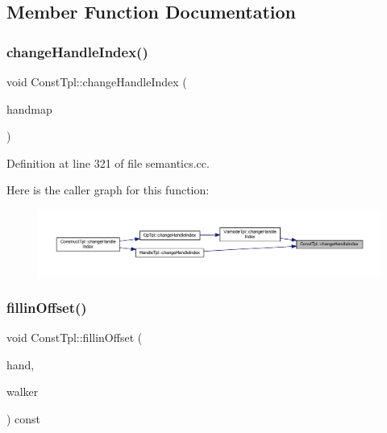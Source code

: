 \subsection{Member Function Documentation}
\mbox{\label{class_const_tpl_abfd18cee78e9e1aedd8f2e2c42f7c40f}} 
\subsubsection{\texorpdfstring{changeHandleIndex()}{changeHandleIndex()}}
{\footnotesize\ttfamily void Const\+Tpl\+::change\+Handle\+Index (\begin{DoxyParamCaption}\item[{const vector$<$ int4 $>$ \&}]{handmap }\end{DoxyParamCaption})}



Definition at line 321 of file semantics.\+cc.

Here is the caller graph for this function\+:
\nopagebreak
\begin{figure}[H]
\begin{center}
\leavevmode
\includegraphics[width=350pt]{class_const_tpl_abfd18cee78e9e1aedd8f2e2c42f7c40f_icgraph}
\end{center}
\end{figure}
\mbox{\label{class_const_tpl_a80f254aea88a52ec15deed96f46d1b97}} 
\subsubsection{\texorpdfstring{fillinOffset()}{fillinOffset()}}
{\footnotesize\ttfamily void Const\+Tpl\+::fillin\+Offset (\begin{DoxyParamCaption}\item[{\mbox{\hyperlink{struct_fixed_handle}{Fixed\+Handle}} \&}]{hand,  }\item[{const \mbox{\hyperlink{class_parser_walker}{Parser\+Walker}} \&}]{walker }\end{DoxyParamCaption}) const}



